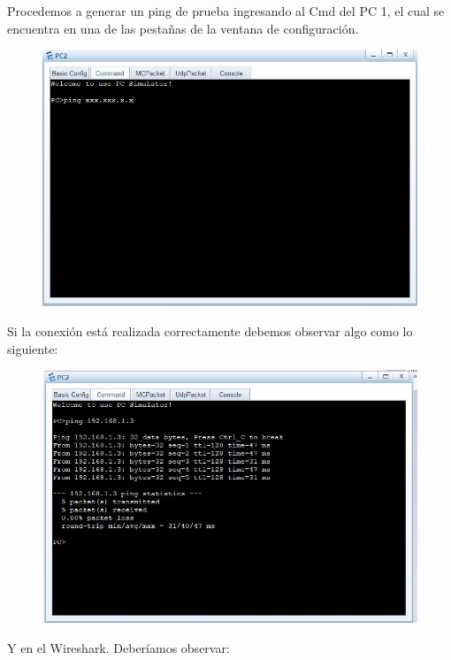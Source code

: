 \documentclass[journal]{IEEEtran}
\begin{document}
Procedemos a generar un ping de prueba ingresando al Cmd del PC 1, el cual se encuentra en una de las pestañas de la ventana de configuración.
\begin{center}
\begin{figure}[H]
\centering
\includegraphics[scale=0.4]{12,5.JPG} 
\end{figure}
\end{center}
Si la conexión está realizada correctamente debemos observar algo como lo siguiente:
\begin{center}
\begin{figure}[H]
\centering
\includegraphics[scale=0.4]{12.JPG} 
\end{figure}
\end{center}
Y en el  Wireshark. Deberíamos observar:
\end{document}
